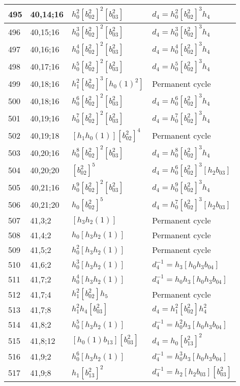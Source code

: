 \documentclass{article}
\begin{document}
\begin{longtable}{|l|l|>{\raggedright\arraybackslash}p{6cm}|>{\raggedright\arraybackslash}p{6cm}|}
\hline
495 & 40,14;16 & $h_0^2[b_{02}^2]^2[b_{03}^2]$ &$d_{4}=h_0^2[b_{02}^2]^3h_4$\\
\hline
496 & 40,15;16 & $h_0^3[b_{02}^2]^2[b_{03}^2]$ &$d_{4}=h_0^3[b_{02}^2]^3h_4$\\
\hline
497 & 40,16;16 & $h_0^4[b_{02}^2]^2[b_{03}^2]$ &$d_{4}=h_0^4[b_{02}^2]^3h_4$\\
\hline
498 & 40,17;16 & $h_0^5[b_{02}^2]^2[b_{03}^2]$ &$d_{4}=h_0^5[b_{02}^2]^3h_4$\\
\hline
499 & 40,18;16 & $h_1^2[b_{02}^2]^3[h_0(1)^2]$ & Permanent cycle\\
500 & 40,18;16 & $h_0^6[b_{02}^2]^2[b_{03}^2]$ &$d_{4}=h_0^6[b_{02}^2]^3h_4$\\
\hline
501 & 40,19;16 & $h_0^7[b_{02}^2]^2[b_{03}^2]$ &$d_{4}=h_0^7[b_{02}^2]^3h_4$\\
\hline
502 & 40,19;18 & $[h_1h_0(1)][b_{02}^2]^4$ & Permanent cycle\\
\hline
503 & 40,20;16 & $h_0^8[b_{02}^2]^2[b_{03}^2]$ &$d_{4}=h_0^8[b_{02}^2]^3h_4$\\
\hline
504 & 40,20;20 & $[b_{02}^2]^5$ &$d_{4}=h_0^6[b_{02}^2]^3[h_2b_{03}]$\\
\hline
505 & 40,21;16 & $h_0^9[b_{02}^2]^2[b_{03}^2]$ &$d_{4}=h_0^9[b_{02}^2]^3h_4$\\
\hline
506 & 40,21;20 & $h_0[b_{02}^2]^5$ &$d_{4}=h_0^7[b_{02}^2]^3[h_2b_{03}]$\\
\hline
507 & 41,3;2 & $[h_3h_2(1)]$ & Permanent cycle\\
\hline
508 & 41,4;2 & $h_0[h_3h_2(1)]$ & Permanent cycle\\
\hline
509 & 41,5;2 & $h_0^2[h_3h_2(1)]$ & Permanent cycle\\
\hline
510 & 41,6;2 & $h_0^3[h_3h_2(1)]$ & $d_{4}^{-1}=h_3[h_0h_3b_{04}]$\\
\hline
511 & 41,7;2 & $h_0^4[h_3h_2(1)]$ & $d_{4}^{-1}=h_0h_3[h_0h_3b_{04}]$\\
\hline
512 & 41,7;4 & $h_1^2[b_{02}^2]h_5$ & Permanent cycle\\
\hline
513 & 41,7;8 & $h_1^2h_4[b_{03}^2]$ &$d_{4}=h_1^2[b_{02}^2]h_4^2$\\
\hline
514 & 41,8;2 & $h_0^5[h_3h_2(1)]$ & $d_{4}^{-1}=h_0^2h_3[h_0h_3b_{04}]$\\
\hline
515 & 41,8;12 & $[h_0(1)b_{13}][b_{03}^2]$ &$d_{4}=h_0[b_{13}^2]^2$\\
\hline
516 & 41,9;2 & $h_0^6[h_3h_2(1)]$ & $d_{4}^{-1}=h_0^3h_3[h_0h_3b_{04}]$\\
\hline
517 & 41,9;8 & $h_1[b_{13}^2]^2$ & $d_{4}^{-1}=h_2[h_2b_{03}][b_{03}^2]$\\

\end{longtable}
\end{document}
